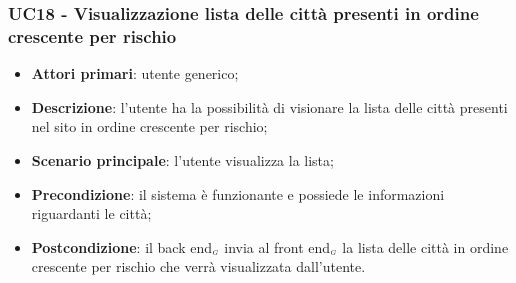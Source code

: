 \subsubsection{UC18 - Visualizzazione lista delle città presenti in ordine crescente per rischio}\label{CasiDUsoCasiDUsoFacoltativiTraUnUtenteEIlFrontEndElencoCasiDUsoUC18VisualizzazioneListaDelleCittaPresentiInOrdineCrescentePerRischio}


\begin{itemize}
	\item \textbf{Attori primari}: utente generico;
	\item \textbf{Descrizione}: l'utente ha la possibilità di visionare la lista delle città presenti nel sito in ordine crescente per rischio;
	\item \textbf{Scenario principale}: l'utente visualizza la lista;
	\item \textbf{Precondizione}:  il sistema è funzionante e possiede le informazioni riguardanti le città;
	\item \textbf{Postcondizione}: il back end$_{\scaleto{G}{3pt}}$ invia al front end$_{\scaleto{G}{3pt}}$ la lista delle città in ordine crescente per rischio che verrà visualizzata dall'utente.
\end{itemize}
